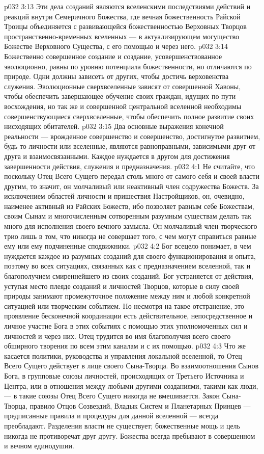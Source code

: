 \vs p032 3:13 Эти дела созданий являются вселенскими последствиями действий и реакций внутри Семеричного Божества, где вечная божественность Райской Троицы объединяется с развивающейся божественностью Верховных Творцов пространственно\hyp{}временных вселенных --- в актуализирующем могущество Божестве Верховного Существа, с его помощью и через него.
\vs p032 3:14 Божественно совершенное создание и создание, усовершенствованное эволюционно, равны по уровню потенциала божественности, но отличаются по природе. Одни должны зависеть от других, чтобы достичь верховенства служения. Эволюционные сверхвселенные зависят от совершенной Хавоны, чтобы обеспечить завершающее обучение своих граждан, идущих по пути восхождения, но так же и совершенной центральной вселенной необходимы совершенствующиеся сверхвселенные, чтобы обеспечить полное развитие своих нисходящих обитателей.
\vs p032 3:15 Два основные выражения конечной реальности --- врожденное совершенство и совершенство, достигнутое развитием, будь то личности или вселенные, являются равноправными, зависимыми друг от друга и взаимосвязанными. Каждое нуждается в другом для достижения завершенности действия, служения и предназначения.
\vs p032 4:1 Не считайте, что поскольку Отец Всего Сущего передал столь много от самого себя и своей власти другим, то значит, он молчаливый или неактивный член содружества Божеств. За исключением областей личности и пришествия Настройщиков, он, очевидно, наименее активный из Райских Божеств, ибо позволяет равным себе Божествам, своим Сынам и многочисленным сотворенным разумным существам делать так много для исполнения своего вечного замысла. Он молчаливый член творческого трио лишь в том, что никогда не совершает того, с чем могут справиться равные ему или ему подчиненные сподвижники.
\vs p032 4:2 Бог всецело понимает, в чем нуждается каждое из разумных созданий для своего функционирования и опыта, поэтому во всех ситуациях, связанных как с предназначением вселенной, так и благополучием смиреннейшего из своих созданий, Бог устраняется от действия, уступая место плеяде созданий и личностей Творцов, которые в силу своей природы занимают промежуточное положение между ним и любой конкретной ситуацией или творческим событием. Но несмотря на такое отстранение, это проявление бесконечной координации есть действительное, непосредственное и личное участие Бога в этих событиях с помощью этих уполномоченных сил и личностей и через них. Отец трудится во имя благополучия всего своего обширного творения по всем этим каналам и с их помощью.
\vs p032 4:3 \pc Что же касается политики, руководства и управления локальной вселенной, то Отец Всего Сущего действует в лице своего Сына\hyp{}Творца. Во взаимоотношения Сынов Бога, в групповые союзы личностей, происходящих от Третьего Источника и Центра, или в отношения между любыми другими созданиями, такими как люди, --- в такие союзы Отец Всего Сущего никогда не вмешивается. Закон Сына\hyp{}Творца, правило Отцов Созвездий, Владык Систем и Планетарных Принцев --- предписанные правила и процедуры для данной вселенной --- всегда преобладают. Разделения власти не существует; божественные мощь и цель никогда не противоречат друг другу. Божества всегда пребывают в совершенном и вечном единодушии.
